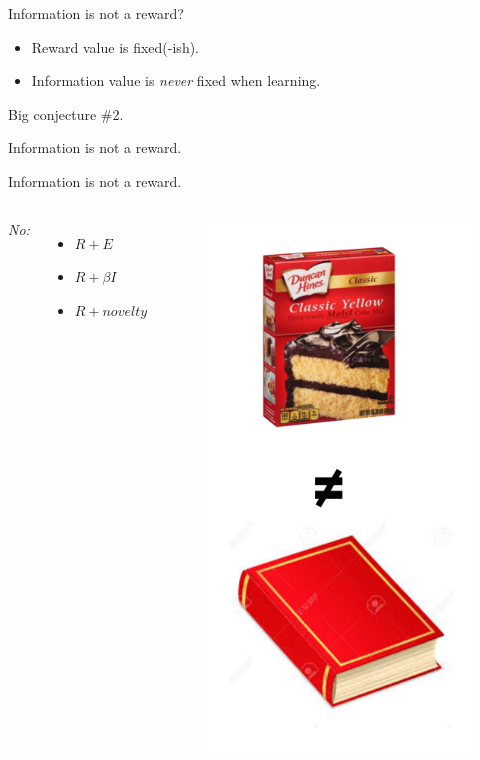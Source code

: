 \documentclass[10pt]{beamer}
\begin{document}
\begin{frame}[fragile]{Information is not a reward?}
\begin{itemize}
    \item Reward value is fixed(-ish).
    \item Information value is \textit{never} fixed when learning.
\end{itemize}
\end{frame}

\begin{frame}[fragile]{Big conjecture \#2.}
\begin{center}
    Information is not a reward.
\end{center}
\end{frame}

\begin{frame}[fragile]{Information is not a reward.}
\begin{columns}
\textit{No:}
\begin{itemize}
    \item $R + E$
    \item $R + \beta I$
    \item $R + novelty$
\end{itemize}

\begin{figure}
    \centering
    \includegraphics[scale=0.4]{images/cake_book.png}
    \caption{}
\end{figure}
\end{columns}
\end{frame}
\end{document}
